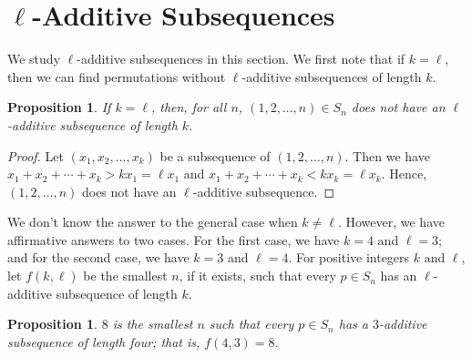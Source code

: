 \documentclass[10pt,a4paper]{amsart}
\newtheorem{proposition}[theorem]{Proposition}
\begin{document}
\section{$\ell$-Additive Subsequences}\label{Section:l-add}
We study $\ell$-additive subsequences in this section. We first note that if $k=\ell$, then we can find permutations without $\ell$-additive subsequences of length $k$.

\begin{proposition}
    If $k=\ell$, then, for all $n$, $(1,2,\ldots,n)\in S_n$ does not have an $\ell$-additive subsequence of length $k$.
\end{proposition}
\begin{proof}
    Let $(x_1,x_2,\ldots,x_k)$ be a subsequence of $(1,2,\ldots,n)$. Then we have $x_1+x_2+\cdots+x_k>kx_1=\ell x_1$ and $x_1+x_2+\cdots+x_k<kx_k=\ell x_k$. Hence, $(1,2,\ldots,n)$ does not have an $\ell$-additive subsequence.
\end{proof}

We don't know the answer to the general case when $k\neq\ell$. However, we have affirmative answers to two cases. For the first case, we have $k=4$ and $\ell=3$; and for the second case, we have $k=3$ and $\ell=4$. For positive integers $k$ and $\ell$, let $f(k,\ell)$ be the smallest $n$, if it exists, such that every $p\in S_n$ has an $\ell$-additive subsequence of length $k$.

\begin{proposition}
$8$ is the smallest $n$ such that every $p\in S_n$ has a $3$-additive subsequence of length four; that is, $f(4,3)=8$.
\end{proposition}
\end{document}
